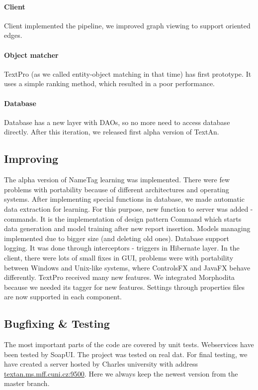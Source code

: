 \paragraph{Client} Client implemented the pipeline, we improved graph viewing to
support oriented edges.

\paragraph{Object matcher} TextPro (as we called entity-object matching in that
time) has first prototype. It uses a simple ranking method, which resulted in a
poor performance. 

\paragraph{Database} Database has a new layer with DAOs, so no more need to
access database directly. After this iteration, we released first alpha version
of TextAn.

\subsection{Improving}
The alpha version of NameTag learning was implemented. There were few problems
with portability because of different architectures and operating systems. After
implementing special functions in database, we made automatic data extraction
for learning. For this purpose, new function to server was added - commands. It
is the implementation of design pattern Command which starts data generation and
model training after new report insertion. Models managing implemented due to
bigger size (and deleting old ones). Database support logging. It was done
through interceptors - triggers in Hibernate layer. In the client, there were
lots of small fixes in GUI, problems were with portability between Windows and
Unix-like systems, where ControlsFX and JavaFX behave differently. TextPro
received many new features. We integrated Morphodita because we needed its
tagger for new features. Settings through properties files are now supported in
each component.

\subsection{Bugfixing \& Testing}
The most important parts of the code are covered by unit tests. Webservices have
been tested by SoapUI. The project was tested on real dat. For final testing, we
have created a server hosted by Charles university with address
\url{textan.ms.mff.cuni.cz:9500}. Here we always keep the newest version from
the master branch.

